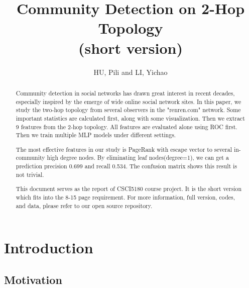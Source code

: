 \documentclass[11pt,a4paper]{article}
\author{HU, Pili and LI, Yichao}
\title{Community Detection on 2-Hop Topology\\(short version)\cite{hu2011-cd2hop}}
\begin{document}
\maketitle

\begin{abstract}
	Community detection in social networks has drawn great interest
	in recent decades, especially inspired by the emerge of wide 
	online social network sites. In this paper, we study the two-hop 
	topology from several observers in the "renren.com" network. 
	Some important statistics are calculated first, along with 
	some visualization. Then we extract 9 features from the 
	2-hop topology. All features are evaluated alone using ROC first. 
	Then we train multiple MLP models under different settings. 
	
	The most effective features in our study is PageRank with escape
	vector to several in-community high degree nodes. 
	By eliminating leaf nodes(degree=1), we can get a prediction
	precision 0.699 and recall 0.534. The confusion matrix shows 
	this result is not trivial. 

	This document serves as the report of CSCI5180 course 
	project\cite{csci5180_lecture,csci5180_tutorial}. 
	It is the short version which fits into the 8-15 page requirement. 
	For more information, full version, codes, and data, please refer to 
	our open source repository\cite{hu2011-cd2hop}. 
	
\end{abstract}

\tableofcontents

\section{Introduction}

\subsection{Motivation}
\end{document}
